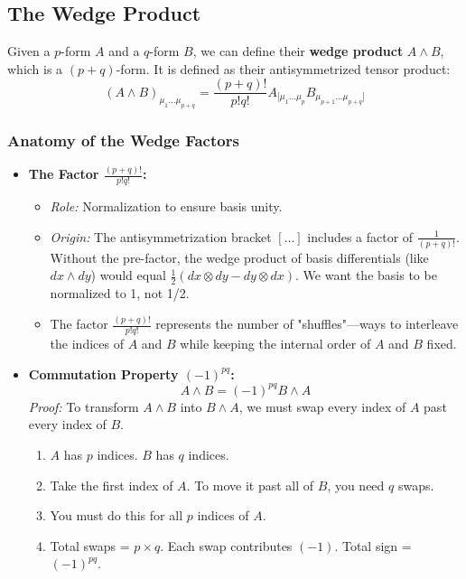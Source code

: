 \documentclass[11pt, a4paper]{report}
\begin{document}
\subsection*{The Wedge Product}
Given a $p$-form $A$ and a $q$-form $B$, we can define their \textbf{wedge product} $A \wedge B$, which is a $(p+q)$-form. It is defined as their antisymmetrized tensor product:
\begin{equation}
    (A \wedge B)_{\mu_1 \dots \mu_{p+q}} = \frac{(p+q)!}{p!q!} A_{[\mu_1 \dots \mu_p} B_{\mu_{p+1} \dots \mu_{p+q}]}
\end{equation}

\subsubsection*{Anatomy of the Wedge Factors}
\begin{itemize}
    \item \textbf{The Factor $\frac{(p+q)!}{p!q!}$:}
    \begin{itemize}
        \item \textit{Role:} Normalization to ensure basis unity.
        \item \textit{Origin:} The antisymmetrization bracket $[\dots]$ includes a factor of $\frac{1}{(p+q)!}$. Without the pre-factor, the wedge product of basis differentials (like $dx \wedge dy$) would equal $\frac{1}{2}(dx \otimes dy - dy \otimes dx)$. We want the basis to be normalized to 1, not 1/2.
        \item The factor $\frac{(p+q)!}{p!q!}$ represents the number of "shuffles"—ways to interleave the indices of $A$ and $B$ while keeping the internal order of $A$ and $B$ fixed.
    \end{itemize}
    
    \item \textbf{Commutation Property $(-1)^{pq}$:}
    \begin{equation}
        A \wedge B = (-1)^{pq} B \wedge A
    \end{equation}
    \textit{Proof:} To transform $A \wedge B$ into $B \wedge A$, we must swap every index of $A$ past every index of $B$.
    \begin{enumerate}
        \item $A$ has $p$ indices. $B$ has $q$ indices.
        \item Take the first index of $A$. To move it past all of $B$, you need $q$ swaps.
        \item You must do this for all $p$ indices of $A$.
        \item Total swaps = $p \times q$. Each swap contributes $(-1)$. Total sign = $(-1)^{pq}$.
    \end{enumerate}
\end{itemize}
\end{document}
